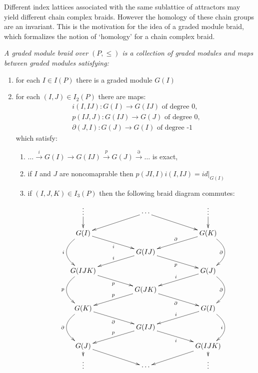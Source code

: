 Different index lattices associated with the same sublattice of attractors may yield different chain complex braids.  However the homology of these chain groups are an invariant.  This is the motivation for the idea of a graded module braid, which formalizes the notion of `homology' for a chain complex braid.


\begin{defn}
{\em
A {\em graded module braid} over $(P,\leq)$ is a collection of graded modules and maps between graded modules satisfying:
\begin{enumerate}
\item for each $I\in I(P)$ there is a graded module $G(I)$
\item for each $(I,J)\in I_2(P)$ there are maps:
\begin{align*}
i(I,IJ):G(I)\to G(IJ) \text{ of degree 0,}\\
p(IJ,J):G(IJ)\to G(J) \text{ of degree 0,}\\
\partial(J,I):G(J)\to G(I) \text{ of degree -1}
\end{align*}
which satisfy:
\begin{enumerate}
\item $\ldots \xrightarrow{i} G(I)\to G(IJ)\xrightarrow{p} G(J) \xrightarrow{\partial} \ldots$ is exact,
\item if $I$ and $J$ are noncomaprable then $p(JI,I)i(I,IJ)=id|_{G(I)}$
\item if $(I,J,K)\in I_3(P)$ then the following braid diagram commutes:
\[
\xymatrixrowsep{0.15in}
\xymatrixcolsep{0.3in}
\xymatrix{
\vdots \ar@{->}[d] && \cdots \ar@{->}[drr] \ar@{->}[dll] && \vdots \ar@{->}[d]\\
G(I)\ar@/_2pc/[dd]_{i} \ar@{->}[drr]_{i} &&  && G(K)\ar@{->}[dll]_{\partial} \ar@/^2pc/[dd]_{\partial}  \\
& &G(IJ) \ar@{->}[dll]_{i} \ar@{->}[drr]_{p} &&\\
G(IJK) \ar@/_2pc/[dd]_{p}  \ar@{->}[drr]_{p} &&  && G(J)\ar@{->}[dll]_{i}  \ar@/^2pc/[dd]_{\partial}  \\
& &G(JK) \ar@{->}[dll]_{p} \ar@{->}[drr]_{\partial} &&\\
G(K)\ar@/_2pc/[dd]_{\partial}    \ar@{->}[drr]_{\partial} &&  && G(I)\ar@{->}[dll]_{i}   \ar@/^2pc/[dd]_{i} \\
& &G(IJ) \ar@{->}[dll]_{p} \ar@{->}[drr]_{i} &&\\
G(J)\ar@{->}[d] \ar@{->}[drr] &&  && G(IJK)\ar@{->}[dll]  \ar@{->}[d] \\
\vdots && \cdots && \vdots}
\] 
\end{enumerate}

\end{enumerate}
}
\end{defn}

